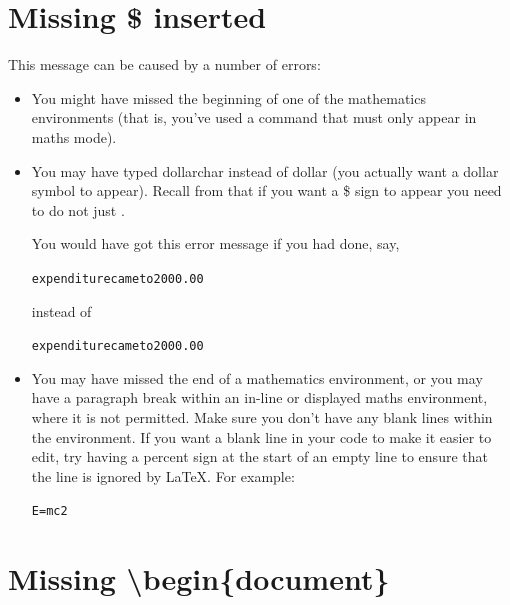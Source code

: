 \section{Missing \$ inserted}

This message can be caused by a number of errors:
\begin{itemize}
\item You might have missed the beginning of one of the mathematics
\glspl{environment} (that is, you've used a
\gls{command} that must only appear in maths mode).

\item You may have typed \gls{dollarchar} instead of \gls{dollar} (you
actually want a dollar symbol to appear).  Recall from
 that if you
want a \$ sign to appear you need to do  not just .

You would have got this error message if you had done, say,
\begin{alltt}\wrong
expenditure came to 2000.00
\end{alltt}
instead of
\begin{alltt}\correct
expenditure came to 2000.00
\end{alltt}

\item You may have missed the end of a mathematics environment, or
you may have a paragraph break within an in-line or
displayed maths environment, where it is
not permitted.  Make sure you don't have any blank lines within the
environment. If you want a blank line in your code to make it easier
to edit, try having a percent sign at the start of an empty line to
ensure that the line is ignored by \LaTeX. For example:
\begin{alltt}
E = mc2
\end{alltt}
\end{itemize}


\section{Missing \textbackslash begin\{document\}}

